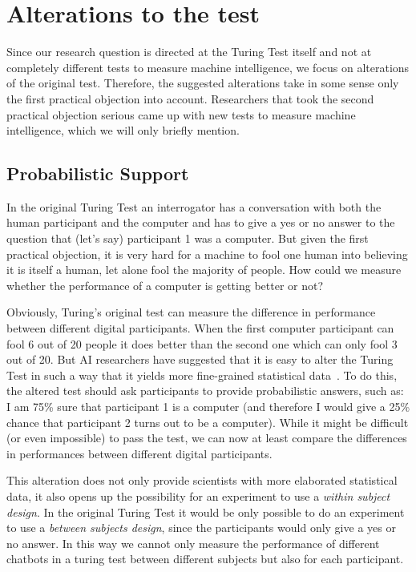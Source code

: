 \section{Alterations to the test}
Since our research question is directed at the Turing Test itself and not at completely different tests to measure machine intelligence, we focus on alterations of the original test. Therefore, the suggested alterations take in some sense only the first practical objection into account. Researchers that took the second practical objection serious came up with new tests to measure machine intelligence, which we will only briefly mention.

\subsection{Probabilistic Support}
In the original Turing Test an interrogator has a conversation with both the human participant and the computer and has to give a yes or no answer to the question that (let's say) participant 1 was a computer. But given the first practical objection, it is very hard for a machine to fool one human into believing it is itself a human, let alone fool the majority of people. How could we measure whether the performance of a computer is getting better or not?

Obviously, Turing's original test can measure the difference in performance between different digital participants. When the first computer participant can fool 6 out of 20 people it does better than the second one which can only fool 3 out of 20. But AI researchers have suggested that it is easy to alter the Turing Test in such a way that it yields more fine-grained statistical data~\cite{shieber2007turing}. To do this, the altered test should ask participants to provide probabilistic answers, such as: I am 75\% sure that participant 1 is a computer (and therefore I would give a 25\% chance that participant 2 turns out to be a computer). While it might be difficult (or even impossible) to pass the test, we can now at least compare the differences in performances between different digital participants.

This alteration does not only provide scientists with more elaborated statistical data, it also opens up the possibility for an experiment to use a \textit{within subject design}. In the original Turing Test it would be only possible to do an experiment to use a \textit{between subjects design}, since the participants would only give a yes or no answer. In this way we cannot only measure the performance of different chatbots in a turing test between different subjects but also for each participant.


